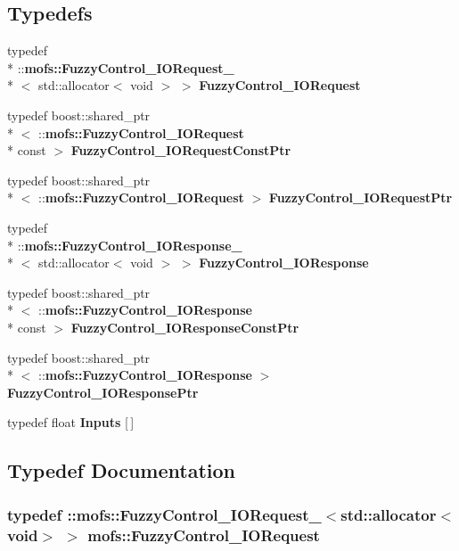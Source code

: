 \subsection*{Typedefs}
\begin{DoxyCompactItemize}
\item 
typedef \\*
\-::{\bf mofs\-::\-Fuzzy\-Control\-\_\-\-I\-O\-Request\-\_\-}\\*
$<$ std\-::allocator$<$ void $>$ $>$ {\bf Fuzzy\-Control\-\_\-\-I\-O\-Request}
\item 
typedef boost\-::shared\-\_\-ptr\\*
$<$ \-::{\bf mofs\-::\-Fuzzy\-Control\-\_\-\-I\-O\-Request} \\*
const  $>$ {\bf Fuzzy\-Control\-\_\-\-I\-O\-Request\-Const\-Ptr}
\item 
typedef boost\-::shared\-\_\-ptr\\*
$<$ \-::{\bf mofs\-::\-Fuzzy\-Control\-\_\-\-I\-O\-Request} $>$ {\bf Fuzzy\-Control\-\_\-\-I\-O\-Request\-Ptr}
\item 
typedef \\*
\-::{\bf mofs\-::\-Fuzzy\-Control\-\_\-\-I\-O\-Response\-\_\-}\\*
$<$ std\-::allocator$<$ void $>$ $>$ {\bf Fuzzy\-Control\-\_\-\-I\-O\-Response}
\item 
typedef boost\-::shared\-\_\-ptr\\*
$<$ \-::{\bf mofs\-::\-Fuzzy\-Control\-\_\-\-I\-O\-Response} \\*
const  $>$ {\bf Fuzzy\-Control\-\_\-\-I\-O\-Response\-Const\-Ptr}
\item 
typedef boost\-::shared\-\_\-ptr\\*
$<$ \-::{\bf mofs\-::\-Fuzzy\-Control\-\_\-\-I\-O\-Response} $>$ {\bf Fuzzy\-Control\-\_\-\-I\-O\-Response\-Ptr}
\item 
typedef float {\bf Inputs} [$\,$]
\end{DoxyCompactItemize}


\subsection{Typedef Documentation}
\subsubsection[{Fuzzy\-Control\-\_\-\-I\-O\-Request}]{\setlength{\rightskip}{0pt plus 5cm}typedef \-::{\bf mofs\-::\-Fuzzy\-Control\-\_\-\-I\-O\-Request\-\_\-}$<$std\-::allocator$<$void$>$ $>$ {\bf mofs\-::\-Fuzzy\-Control\-\_\-\-I\-O\-Request}}\label{namespacemofs_aac68c8d340357937dcf461e586fc9104}


